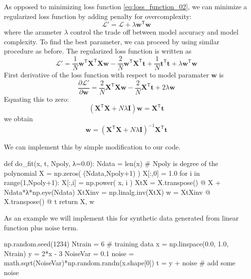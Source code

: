 \documentclass[b5paper,12pt]{article} %
\begin{document}
As opposed to minimizing loss function \eqref{eq:loss_function_02}, we can minimize
a regularized loss function by adding penalty for overcomplexity:
\begin{equation*}
\mathcal{L}' = \mathcal{L} + \lambda \mathbf{w}^{\mathsf{T}} \mathbf{w}
\end{equation*}
where the arameter $\lambda$ control the trade off between model accuracy and
model complexity.
To find the best parameter, we can proceed by using similar procedure as before.
The regularized loss function is written as
\begin{equation}
\mathcal{L}' = \frac{1}{N} \mathbf{w}^{\mathsf{T}} \mathbf{X}^{\mathsf{T}} \mathbf{X} \mathbf{w}
- \frac{2}{N} \mathbf{w}^{\mathsf{T}} \mathbf{X}^{\mathsf{T}} \mathbf{t}
+ \frac{1}{N} \mathbf{t}^{\mathsf{T}} \mathbf{t}
+ \lambda \mathbf{w}^{\mathsf{T}} \mathbf{w}
\end{equation}
First derivative of the loss function with respect to model paramater $\mathbf{w}$ is
\begin{equation*}
\frac{\partial \mathcal{L}'}{\partial \mathbf{w}} =
\frac{2}{N} \mathbf{X}^{\mathsf{T}} \mathbf{X} \mathbf{w}
- \frac{2}{N} \mathbf{X}^{\mathsf{T}} \mathbf{t} + 2\lambda\mathbf{w}
\end{equation*}
Equating this to zero:
\begin{equation*}
( \mathbf{X}^{\mathsf{T}} \mathbf{X} + N \lambda \mathbf{I} ) \mathbf{w} = \mathbf{X}^{\mathsf{T}} \mathbf{t}
\end{equation*}
we obtain
\begin{equation}
\mathbf{w} =
( \mathbf{X}^{\mathsf{T}} \mathbf{X} + N \lambda \mathbf{I} )^{-1}
\mathbf{X}^{\mathsf{T}} \mathbf{t}
\end{equation}

We can implement this by simple modification to our code.
\begin{pythoncode}
def do_fit(x, t, Npoly, λ=0.0):
    Ndata = len(x)
    # Npoly is degree of the polynomial
    X = np.zeros( (Ndata,Npoly+1) )
    X[:,0] = 1.0
    for i in range(1,Npoly+1):
        X[:,i] = np.power( x, i )
    XtX = X.transpose() @ X + Ndata*λ*np.eye(Ndata)
    XtXinv = np.linalg.inv(XtX)
    w = XtXinv @ X.transpose() @ t
    return X, w
\end{pythoncode}

As an example we will implement this for synthetic data generated from linear
function plus noise term.
\begin{juliacode}
np.random.seed(1234)
Ntrain = 6 # training data
x = np.linspace(0.0, 1.0, Ntrain)
y = 2*x - 3
NoiseVar = 0.1
noise = math.sqrt(NoiseVar)*np.random.randn(x.shape[0])
t = y + noise # add some noise
\end{juliacode}
\end{document}
